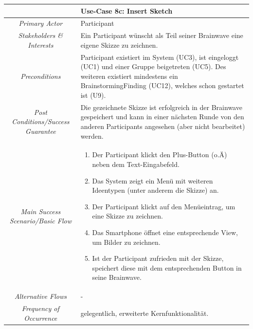 \renewcommand{\arraystretch}{1.35}
\begin{center}
	\begin{longtable}{| c | p{7cm} |}
		\hline
		\multicolumn{2}{|c|}{\textbf{Use-Case 8c: Insert Sketch}}\\
		\hline\hline
		\textit{Primary Actor} & Participant\\
		\hline
		\textit{Stakeholders \& Interests} & Ein Participant wünscht als Teil seiner Brainwave eine eigene Skizze zu zeichnen. \\
		\hline
		\textit{Preconditions} & Participant existiert im System (UC3), ist eingeloggt (UC1) und einer Gruppe beigetreten (UC5). Des weiteren existiert mindestens ein BrainstormingFinding (UC12), welches schon gestartet ist (U9).\\
		\hline
		\textit{Post Conditions/Success Guarantee} & Die gezeichnete Skizze ist erfolgreich in der Brainwave gespeichert und kann in einer nächsten Runde von den anderen Participants angesehen (aber nicht bearbeitet) werden.\\
		\hline
		\textit{Main Success Scenario/Basic Flow} & 
		\begin{enumerate}[noitemsep]
			\item Der Participant klickt den Plus-Button (o.Ä) neben dem Text-Eingabefeld.
			\item Das System zeigt ein Menü mit weiteren Ideentypen (unter anderem die Skizze) an.
			\item Der Participant klickt auf den Menüeintrag, um eine Skizze zu zeichnen.
			\item Das Smartphone öffnet eine entsprechende View, um Bilder zu zeichnen.
			\item Ist der Participant zufrieden mit der Skizze, speichert diese mit dem entsprechenden Button in seine Brainwave.
		\end{enumerate}\\
		\hline
		\textit{Alternative Flows} &
		-\\
		\hline
		\textit{Frequency of Occurrence} & gelegentlich, erweiterte Kernfunktionalität.\\
		\hline
	\end{longtable}
\end{center}

